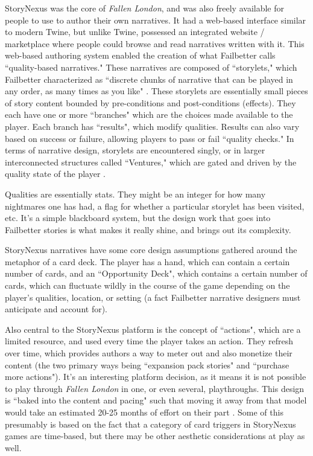 StoryNexus was the core of \textit{Fallen London}, and was also freely available for people to use to author their own narratives. It had a web-based interface similar to modern Twine, but unlike Twine, possessed an integrated website / marketplace where people could browse and read narratives written with it. This web-based authoring system enabled the creation of what Failbetter calls ``quality-based narratives." These narratives are composed of ``storylets," which Failbetter characterized as ``discrete chunks of narrative that can be played in any order, as many times as you like" \cite{arendt_structuresOne}. These storylets are essentially small pieces of story content bounded by pre-conditions and post-conditions (effects). They each have one or more ``branches" which are the choices made available to the player. Each branch has ``results", which modify qualities. Results can also vary based on success or failure, allowing players to pass or fail ``quality checks." In terms of narrative design, storylets are encountered singly, or in larger interconnected structures called ``Ventures," which are gated and driven by the quality state of the player \cite{ifwiki_2019}.

Qualities are essentially stats. They might be an integer for how many nightmares one has had, a flag for whether a particular storylet has been visited, etc. It's a simple blackboard system, but the design work that goes into Failbetter stories is what makes it really shine, and brings out its complexity.

StoryNexus narratives have some core design assumptions gathered around the metaphor of a card deck. The player has a hand, which can contain a certain number of cards, and an ``Opportunity Deck", which contains a certain number of cards, which can fluctuate wildly in the course of the game depending on the player's qualities, location, or setting (a fact Failbetter narrative designers must anticipate and account for).

Also central to the StoryNexus platform is the concept of ``actions", which are a limited resource, and used every time the player takes an action. They refresh over time, which provides authors a way to meter out and also monetize their content (the two primary ways being ``expansion pack stories" and ``purchase more actions"). It's an interesting platform decision, as it means it is not possible to play through \textit{Fallen London} in one, or even several, playthroughs. This design is ``baked into the content and pacing" such that moving it away from that model would take an estimated 20-25 months of effort on their part \cite{failbetter_ftp}. Some of this presumably is based on the fact that a category of card triggers in StoryNexus games are time-based, but there may be other aesthetic considerations at play as well.

